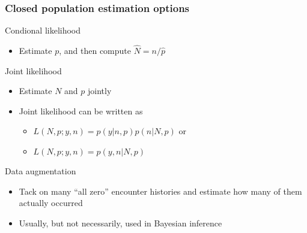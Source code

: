 \documentclass[color=usenames,dvipsnames]{beamer}\usepackage[]{graphicx}\usepackage[]{color}
\begin{document}
\begin{frame}
  \frametitle{Closed population estimation options}
  Condional likelihood \\
  \begin{itemize}
    \item Estimate $p$, and then compute $\hat{N}=n/\hat{p}$
  \end{itemize}
  \pause
  \vfill
  Joint likelihood \\
  \begin{itemize}
    \item Estimate $N$ and $p$ jointly
    \item Joint likelihood can be written as
      \begin{itemize}
      \item $L(N,p;y,n) = p(y|n,p)p(n|N,p)$ or
      \item $L(N,p;y,n) = p(y,n|N,p)$
      \end{itemize}
  \end{itemize}
  \pause \vfill
  Data augmentation \\
  \begin{itemize}
    \item Tack on many ``all zero'' encounter histories and estimate
      how many of them actually occurred
    \item Usually, but not necessarily, used in Bayesian inference
  \end{itemize}
\end{frame}
\end{document}
